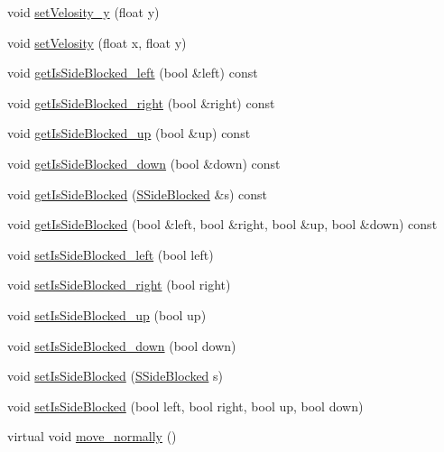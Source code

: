 \begin{DoxyCompactItemize}
\item 
void \hyperlink{classengine_1_1CMovable_ac1ed31991776939ada3d50e551017ab4}{set\-Velosity\-\_\-y} (float y)
\item 
void \hyperlink{classengine_1_1CMovable_a5e7a42eb65b12035d2c6104f28f2f0fc}{set\-Velosity} (float x, float y)
\item 
void \hyperlink{classengine_1_1CMovable_a5774652cd5369fad6b08cf4de56f91c0}{get\-Is\-Side\-Blocked\-\_\-left} (bool \&left) const 
\item 
void \hyperlink{classengine_1_1CMovable_a7790f286b529e31de0226f72c574faef}{get\-Is\-Side\-Blocked\-\_\-right} (bool \&right) const 
\item 
void \hyperlink{classengine_1_1CMovable_a542748edb84d3e43bb479278c8b38e06}{get\-Is\-Side\-Blocked\-\_\-up} (bool \&up) const 
\item 
void \hyperlink{classengine_1_1CMovable_a85d5cf13541670517f1a49d57d49107a}{get\-Is\-Side\-Blocked\-\_\-down} (bool \&down) const 
\item 
void \hyperlink{classengine_1_1CMovable_a7252ea478abaab25c1774ccfd1f52554}{get\-Is\-Side\-Blocked} (\hyperlink{structengine_1_1SSideBlocked}{S\-Side\-Blocked} \&s) const 
\item 
void \hyperlink{classengine_1_1CMovable_a19c9b69038fe22d0a08228b7eaed8c1b}{get\-Is\-Side\-Blocked} (bool \&left, bool \&right, bool \&up, bool \&down) const 
\item 
void \hyperlink{classengine_1_1CMovable_aa7f9177dee6821517c845f1d369f8cde}{set\-Is\-Side\-Blocked\-\_\-left} (bool left)
\item 
void \hyperlink{classengine_1_1CMovable_af1059fe2fbaf39598efe0a234d8cbc9e}{set\-Is\-Side\-Blocked\-\_\-right} (bool right)
\item 
void \hyperlink{classengine_1_1CMovable_a73ec50c7ed0037c4abe4aaa41ffe68d7}{set\-Is\-Side\-Blocked\-\_\-up} (bool up)
\item 
void \hyperlink{classengine_1_1CMovable_a454f67c854ad8f16c7251bc1011a2673}{set\-Is\-Side\-Blocked\-\_\-down} (bool down)
\item 
void \hyperlink{classengine_1_1CMovable_aafcffa645994fb19515bcb84cf083c9f}{set\-Is\-Side\-Blocked} (\hyperlink{structengine_1_1SSideBlocked}{S\-Side\-Blocked} s)
\item 
void \hyperlink{classengine_1_1CMovable_a61e5537f10e7ff0f111c1ad355f0f6ed}{set\-Is\-Side\-Blocked} (bool left, bool right, bool up, bool down)
\item 
virtual void \hyperlink{classengine_1_1CMovable_a6184018afcab4be164c3b02228175a9c}{move\-\_\-normally} ()

\end{DoxyCompactItemize}
